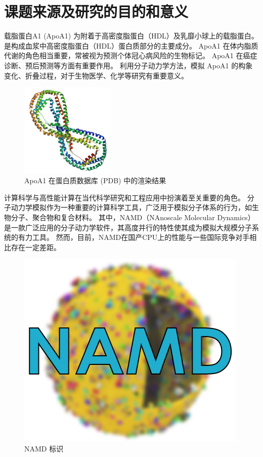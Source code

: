 \section{课题来源及研究的目的和意义}

载脂蛋白A1 (ApoA1) 为附着于高密度脂蛋白（HDL）及乳靡小球上的载脂蛋白。
是构成血浆中高密度脂蛋白（HDL）蛋白质部分的主要成分。
ApoA1 在体内脂质代谢的角色相当重要，常被视为预测个体冠心病风险的生物标记。
ApoA1 在癌症诊断\cite{limwjxtd}、预后预测\cite{apoayuhz}等方面有重要作用。
利用分子动力学方法，模拟 ApoA1 的构象变化、折叠过程，对于生物医学、化学等研究有重要意义。


\begin{figure}[H]
    \centering
    \includegraphics[width=0.4\textwidth]{images/PBB_Protein_APOA1_image.jpg}
    \caption{ApoA1 在蛋白质数据库 (PDB) 中的渲染结果}
\end{figure}

计算科学与高性能计算在当代科学研究和工程应用中扮演着至关重要的角色。
分子动力学模拟作为一种重要的计算科学工具，广泛用于模拟分子体系的行为，如生物分子、聚合物和复合材料。
其中，NAMD（NAnoscale Molecular Dynamics）\cite{phillips2005scalable}是一款广泛应用的分子动力学软件，其高度并行的特性使其成为模拟大规模分子系统的有力工具。
然而，目前，NAMD在国产CPU上的性能与一些国际竞争对手相比存在一定差距。


\begin{figure}[H]
    \centering
    \includegraphics{images/namd-logo.png}
    \caption{NAMD 标识}
\end{figure}


